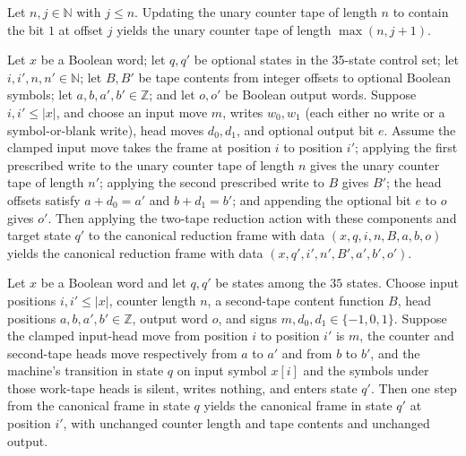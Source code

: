 \begin{lemma}
\label{Complexity.satRedCounter_write}
\leanok
{}
Let $n,j\in\mathbb{N}$ with $j\le n$. Updating the unary counter tape of length $n$ to
contain the bit $1$ at offset $j$ yields the unary counter tape of length $\max(n,j+1)$.
\end{lemma}

\begin{lemma}
\label{Complexity.satRedAction_apply}
\leanok
{}
Let $x$ be a Boolean word; let $q,q'$ be optional states in the 35-state control set;
let $i,i',n,n'\in\mathbb{N}$; let $B,B'$ be tape contents from integer offsets to
optional Boolean symbols; let $a,b,a',b'\in\mathbb{Z}$; and let $o,o'$ be Boolean output
words. Suppose $i,i'\le |x|$, and choose an input move $m$, writes $w_0,w_1$ (each
either no write or a symbol-or-blank write), head moves $d_0,d_1$, and optional output
bit $e$. Assume the clamped input move takes the frame at position $i$ to position $i'$;
applying the first prescribed write to the unary counter tape of length $n$ gives the
unary counter tape of length $n'$; applying the second prescribed write to $B$ gives
$B'$; the head offsets satisfy $a+d_0=a'$ and $b+d_1=b'$; and appending the optional bit
$e$ to $o$ gives $o'$. Then applying the two-tape reduction action with these components
and target state $q'$ to the canonical reduction frame with data $(x,q,i,n,B,a,b,o)$
yields the canonical reduction frame with data $(x,q',i',n',B',a',b',o')$.
\end{lemma}

\begin{lemma}
\label{Complexity.satRed_move}
\leanok
{}
Let $x$ be a Boolean word and let $q,q'$ be states among the $35$ states. Choose input
positions $i,i'\le |x|$, counter length $n$, a second-tape content function $B$, head
positions $a,b,a',b'\in\mathbb{Z}$, output word $o$, and signs $m,d_0,d_1\in\{-1,0,1\}$.
Suppose the clamped input-head move from position $i$ to position $i'$ is $m$, the
counter and second-tape heads move respectively from $a$ to $a'$ and from $b$ to $b'$,
and the machine's transition in state $q$ on input symbol $x[i]$ and the symbols under
those work-tape heads is silent, writes nothing, and enters state $q'$. Then one step
from the canonical frame in state $q$ yields the canonical frame in state $q'$ at
position $i'$, with unchanged counter length and tape contents and unchanged output.
\end{lemma}

